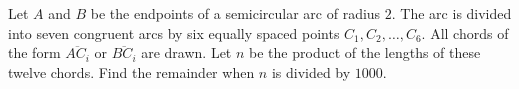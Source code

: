 Let $A$ and $B$ be the endpoints of a semicircular arc of radius $2$. The arc is divided into seven congruent arcs by six equally spaced points $C_1,C_2,\dots,C_6$. All chords of the form $\overline{AC_i}$ or $\overline{BC_i}$ are drawn. Let $n$ be the product of the lengths of these twelve chords. Find the remainder when $n$ is divided by $1000$.
